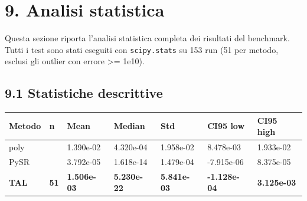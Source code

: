\documentclass[
]{article}
\begin{document}
\section{9. Analisi statistica}\label{analisi-statistica}

Questa sezione riporta l'analisi statistica completa dei risultati del
benchmark. Tutti i test sono stati eseguiti con \texttt{scipy.stats} su
153 run (51 per metodo, esclusi gli outlier con errore \textgreater=
1e10).

\subsection{9.1 Statistiche descrittive}\label{statistiche-descrittive}

\begin{longtable}[]{@{}
  >{\raggedright\arraybackslash}p{}
  >{\raggedright\arraybackslash}p{}
  >{\raggedright\arraybackslash}p{}
  >{\raggedright\arraybackslash}p{}
  >{\raggedright\arraybackslash}p{}
  >{\raggedright\arraybackslash}p{}
  >{\raggedright\arraybackslash}p{}@{}}
\toprule\noalign{}
\begin{minipage}[b]{\linewidth}\raggedright
Metodo
\end{minipage} & \begin{minipage}[b]{\linewidth}\raggedright
n
\end{minipage} & \begin{minipage}[b]{\linewidth}\raggedright
Mean
\end{minipage} & \begin{minipage}[b]{\linewidth}\raggedright
Median
\end{minipage} & \begin{minipage}[b]{\linewidth}\raggedright
Std
\end{minipage} & \begin{minipage}[b]{\linewidth}\raggedright
CI95 low
\end{minipage} & \begin{minipage}[b]{\linewidth}\raggedright
CI95 high
\end{minipage} \\
\midrule\noalign{}
\endhead
\bottomrule\noalign{}
\endlastfoot
poly & 51 & 1.390e-02 & 4.320e-04 & 1.958e-02 & 8.478e-03 & 1.933e-02 \\
PySR & 41 & 3.792e-05 & 1.618e-14 & 1.479e-04 & -7.915e-06 &
8.375e-05 \\
\textbf{TAL} & \textbf{51} & \textbf{1.506e-03} & \textbf{5.230e-22} &
\textbf{5.841e-03} & \textbf{-1.128e-04} & \textbf{3.125e-03} \\
\end{longtable}
\end{document}
